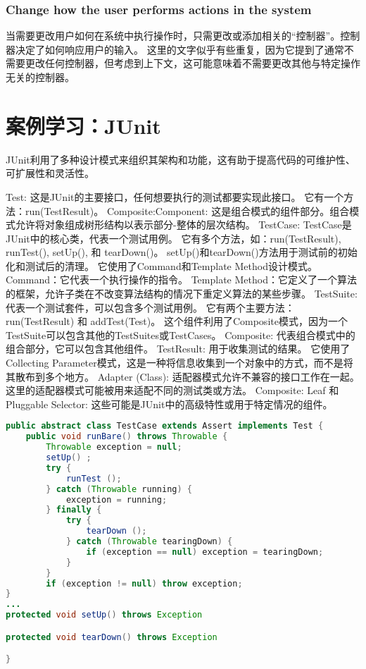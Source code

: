 \subsubsection{Change how the user performs actions in the system}
当需要更改用户如何在系统中执行操作时，只需更改或添加相关的“控制器”。控制器决定了如何响应用户的输入。
这里的文字似乎有些重复，因为它提到了通常不需要更改任何控制器，但考虑到上下文，这可能意味着不需要更改其他与特定操作无关的控制器。


\section{案例学习：JUnit}

JUnit利用了多种设计模式来组织其架构和功能，这有助于提高代码的可维护性、可扩展性和灵活性。

Test:
这是JUnit的主要接口，任何想要执行的测试都要实现此接口。
它有一个方法：run(TestResult)。
Composite:Component:
这是组合模式的组件部分。组合模式允许将对象组成树形结构以表示部分-整体的层次结构。
TestCase:
TestCase是JUnit中的核心类，代表一个测试用例。
它有多个方法，如：run(TestResult), runTest(), setUp(), 和 tearDown()。
setUp()和tearDown()方法用于测试前的初始化和测试后的清理。
它使用了Command和Template Method设计模式。
Command：它代表一个执行操作的指令。
Template Method：它定义了一个算法的框架，允许子类在不改变算法结构的情况下重定义算法的某些步骤。
TestSuite:
代表一个测试套件，可以包含多个测试用例。
它有两个主要方法：run(TestResult) 和 addTest(Test)。
这个组件利用了Composite模式，因为一个TestSuite可以包含其他的TestSuites或TestCases。
Composite:
代表组合模式中的组合部分，它可以包含其他组件。
TestResult:
用于收集测试的结果。
它使用了Collecting Parameter模式，这是一种将信息收集到一个对象中的方式，而不是将其散布到多个地方。
Adapter (Class):
适配器模式允许不兼容的接口工作在一起。这里的适配器模式可能被用来适配不同的测试类或方法。
Composite: Leaf 和 Pluggable Selector:
这些可能是JUnit中的高级特性或用于特定情况的组件。

\begin{lstlisting}[language=Java, caption=JUnit Case Study Example, label=lst:junit_case_study]
public abstract class TestCase extends Assert implements Test {
	public void runBare() throws Throwable {
		Throwable exception = null;
		setUp() ;
		try {
			runTest ();
		} catch (Throwable running) {
			exception = running;
		} finally {
			try {
				tearDown ();
			} catch (Throwable tearingDown) {
				if (exception == null) exception = tearingDown;
			}
		}
		if (exception != null) throw exception;
}
...
protected void setUp() throws Exception

protected void tearDown() throws Exception

}
\end{lstlisting}

